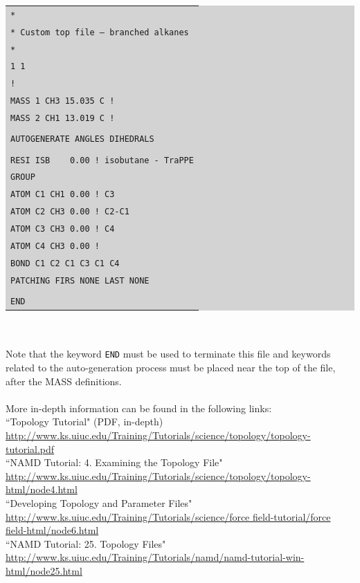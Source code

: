 \colorbox{lightgray}{
\begin{tabular}{l}
\texttt{*}\\
\texttt{* Custom top file -- branched alkanes}\\
\texttt{*}\\
\texttt{1  1}\\
\texttt{!}\\
\texttt{MASS   1  CH3  15.035 C !}\\
\texttt{MASS   2  CH1  13.019 C !}\\\\
\texttt{AUTOGENERATE ANGLES DIHEDRALS}\\\\
\texttt{RESI ISB ~~ 0.00 ! isobutane - TraPPE}\\
\texttt{GROUP}\\
\texttt{ATOM C1 CH1    0.00 !    C3}\\
\texttt{ATOM C2 CH3    0.00 ! C2-C1}\\
\texttt{ATOM C3 CH3    0.00 !    C4}\\
\texttt{ATOM C4 CH3    0.00 !}\\
\texttt{BOND C1 C2 C1 C3 C1 C4}\\
\texttt{PATCHING FIRS NONE LAST NONE}\\\\
\texttt{END}
\end{tabular}}\\\\
Note that the keyword \texttt{END} must be used to terminate this file and keywords related to the auto-generation process must be placed near the top of the file, after the MASS definitions.\\\\
More in-depth information can be found in the following links:\\
``Topology Tutorial" (PDF, in-depth)\\
\url{http://www.ks.uiuc.edu/Training/Tutorials/science/topology/topology-tutorial.pdf}\\
``NAMD Tutorial: 4. Examining the Topology File"\\
\url{http://www.ks.uiuc.edu/Training/Tutorials/science/topology/topology-html/node4.html}\\
``Developing Topology and Parameter Files"\\
\url{http://www.ks.uiuc.edu/Training/Tutorials/science/force field-tutorial/force field-html/node6.html}\\
``NAMD Tutorial: 25. Topology Files"\\
\url{http://www.ks.uiuc.edu/Training/Tutorials/namd/namd-tutorial-win-html/node25.html}

